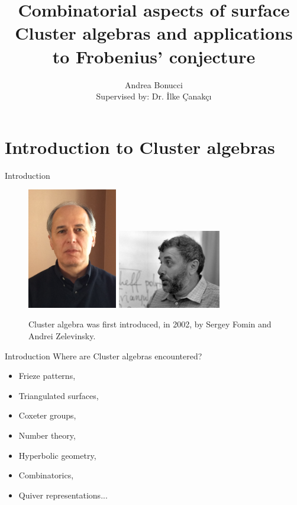 \documentclass{beamer}
\title[Cluster algebras and Frobenius' conjecture]{Combinatorial aspects of surface Cluster algebras and applications to Frobenius' conjecture}
\institute[VU]{Vrije Universiteit}
\author[Andrea Bonucci]{Andrea Bonucci\\{\small Supervised by: Dr. {\.{I}}lke {\c{C}}anak{\c{c}}{\i}}}
\begin{document}
\maketitle
\section{Introduction to Cluster algebras}

\begin{frame}{Introduction} 
    \begin{figure}
        \centering
            \includegraphics[width=0.35\textwidth]{Images/fominphoto.jpg}
            \hfill
            \includegraphics[width=0.4\textwidth]{Images/zelevinskiphoto.jpeg}
        \caption{Cluster algebra was first introduced, in 2002, by Sergey Fomin and Andrei Zelevinsky.}
        \label{fig:my_label}
    \end{figure}
\end{frame}

\begin{frame}{Introduction}
    Where are Cluster algebras encountered?
    \pause
    \begin{itemize}
        \item Frieze patterns,
        \item Triangulated surfaces,
        \item Coxeter groups,
        \item Number theory,
        \item Hyperbolic geometry,
        \item Combinatorics,
        \item Quiver representations...
    \end{itemize}
\end{frame}
\end{document}

